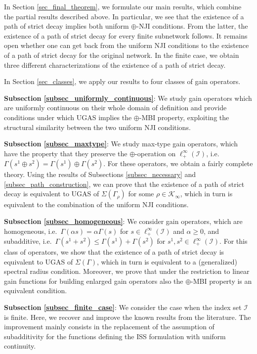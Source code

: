 \documentclass[10pt, oneside, a4paper]{article}
\newcommand{\IC}{\mathcal{I}}
\newcommand{\KC}{\mathcal{K}}
\begin{document}
In Section \ref{sec_final_theorem}, we formulate our main results, which combine the partial results described above. In particular, we see that the existence of a path of strict decay implies both uniform $\oplus$-NJI conditions. From the latter, the existence of a path of strict decay for every finite subnetwork follows. It remains open whether one can get back from the uniform NJI conditions to the existence of a path of strict decay for the original network. In the finite case, we obtain three different characterizations of the existence of a path of strict decay.%

In Section \ref{sec_classes}, we apply our results to four classes of gain operators.%

{\bf Subsection \ref{subsec_uniformly_continuous}}: We study gain operators which are uniformly continuous on their whole domain of definition and provide conditions under which UGAS implies the $\oplus$-MBI property, exploiting the structural similarity between the two uniform NJI conditions.%

{\bf Subsection \ref{subsec_maxtype}}: We study max-type gain operators, which have the property that they preserve the $\oplus$-operation on $\ell^{\infty}_+(\IC)$, i.e.~$\Gamma(s^1 \oplus s^2) = \Gamma(s^1) \oplus \Gamma(s^2)$. For these operators, we obtain a fairly complete theory. Using the results of Subsections \ref{subsec_necessary} and \ref{subsec_path_construction}, we can prove that the existence of a path of strict decay is equivalent to UGAS of $\Sigma(\Gamma_{\rho})$ for some $\rho \in \KC_{\infty}$, which in turn is equivalent to the combination of the uniform NJI conditions.%

{\bf Subsection \ref{subsec_homogeneous}}: We consider gain operators, which are homogeneous, i.e.~$\Gamma(\alpha s) = \alpha \Gamma(s)$ for $s \in \ell^{\infty}_+(\IC)$ and $\alpha \geq 0$, and subadditive, i.e.~$\Gamma(s^1 + s^2) \leq \Gamma(s^1) + \Gamma(s^2)$ for $s^1,s^2 \in \ell^{\infty}_+(\IC)$. For this class of operators, we show that the existence of a path of strict decay is equivalent to UGAS of $\Sigma(\Gamma)$, which in turn is equivalent to a (generalized) spectral radius condition. Moreover, we prove that under the restriction to linear gain functions for building enlarged gain operators also the $\oplus$-MBI property is an equivalent condition.%

{\bf Subsection \ref{subsec_finite_case}}: We consider the case when the index set $\IC$ is finite. Here, we recover and improve the known results from the literature. The improvement mainly consists in the replacement of the assumption of subadditivity for the functions defining the ISS formulation with uniform continuity.%
\end{document}
